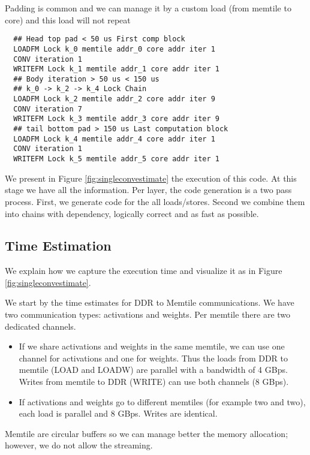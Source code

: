 \documentclass[sigconf]{acmart}
\begin{document}
Padding is common and we can manage it by a custom load (from memtile
to core) and this load will not repeat {\small
\begin{verbatim}
  ## Head top pad < 50 us First comp block
  LOADFM Lock k_0 memtile addr_0 core addr iter 1
  CONV iteration 1
  WRITEFM Lock k_1 memtile addr_1 core addr iter 1
  ## Body iteration > 50 us < 150 us
  ## k_0 -> k_2 -> k_4 Lock Chain
  LOADFM Lock k_2 memtile addr_2 core addr iter 9
  CONV iteration 7
  WRITEFM Lock k_3 memtile addr_3 core addr iter 9
  ## tail bottom pad > 150 us Last computation block
  LOADFM Lock k_4 memtile addr_4 core addr iter 1
  CONV iteration 1
  WRITEFM Lock k_5 memtile addr_5 core addr iter 1
\end{verbatim}
 } We present in Figure \ref{fig:singleconvestimate} the execution of
this code. At this stage we have all the information. Per layer, the
code generation is a two pass process. First, we generate code for the
all loads/stores. Second we combine them into chains with dependency,
logically correct and as fast as possible.


\subsection{Time Estimation}
We explain how we capture the execution time and visualize it as in
Figure \ref{fig:singleconvestimate}. %

We start by the time estimates for DDR to Memtile communications. We
have two communication types: activations and weights. Per memtile
there are two dedicated channels.
\begin{itemize}
 \item If we share activations and weights in the same memtile, we can
   use one channel for activations and one for weights. Thus the loads
   from DDR to memtile (LOAD and LOADW) are parallel with a bandwidth
   of 4 GBps. Writes from memtile to DDR (WRITE) can use both channels
   (8 GBps).

 \item If activations and weights go to different memtiles (for
   example two and two), each load is parallel and 8 GBps. Writes are
   identical.
\end{itemize}
Memtile are circular buffers so we can manage better the memory
allocation; however,  we do not allow the streaming. %
   
\end{document}
